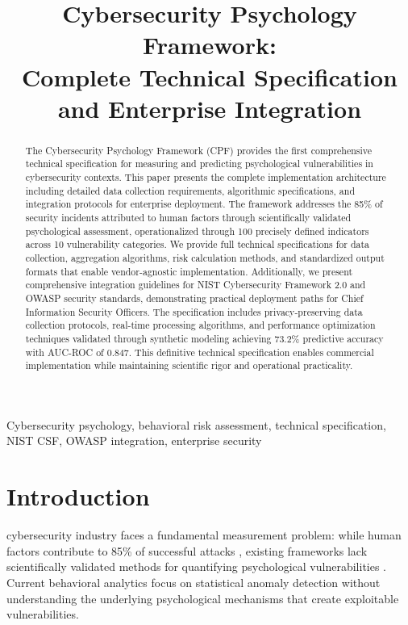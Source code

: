 \documentclass[10pt,twocolumn]{IEEEtran}
\begin{document}
\title{Cybersecurity Psychology Framework: \\
Complete Technical Specification and Enterprise Integration}

\author{
}

\maketitle

\begin{abstract}
The Cybersecurity Psychology Framework (CPF) provides the first comprehensive technical specification for measuring and predicting psychological vulnerabilities in cybersecurity contexts. This paper presents the complete implementation architecture including detailed data collection requirements, algorithmic specifications, and integration protocols for enterprise deployment. The framework addresses the 85\% of security incidents attributed to human factors through scientifically validated psychological assessment, operationalized through 100 precisely defined indicators across 10 vulnerability categories. We provide full technical specifications for data collection, aggregation algorithms, risk calculation methods, and standardized output formats that enable vendor-agnostic implementation. Additionally, we present comprehensive integration guidelines for NIST Cybersecurity Framework 2.0 and OWASP security standards, demonstrating practical deployment paths for Chief Information Security Officers. The specification includes privacy-preserving data collection protocols, real-time processing algorithms, and performance optimization techniques validated through synthetic modeling achieving 73.2\% predictive accuracy with AUC-ROC of 0.847. This definitive technical specification enables commercial implementation while maintaining scientific rigor and operational practicality.
\end{abstract}

\begin{IEEEkeywords}
Cybersecurity psychology, behavioral risk assessment, technical specification, NIST CSF, OWASP integration, enterprise security
\end{IEEEkeywords}

\section{Introduction}
 cybersecurity industry faces a fundamental measurement problem: while human factors contribute to 85\% of successful attacks \cite{verizon2024}, existing frameworks lack scientifically validated methods for quantifying psychological vulnerabilities \cite{sans2024}. Current behavioral analytics focus on statistical anomaly detection without understanding the underlying psychological mechanisms that create exploitable vulnerabilities.
\end{document}
